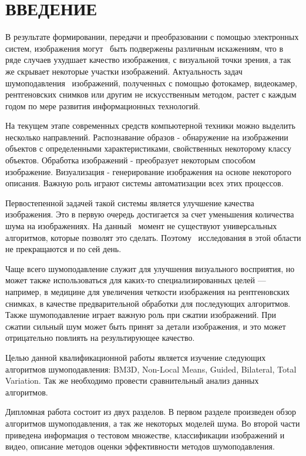 \section*{ВВЕДЕНИЕ}
В результате формировании, передачи и преобразовании с помощью электронных систем, изображения могут 
быть подвержены различным искажениям, что в ряде случаев ухудшает качество изображения, с визуальной
точки зрения, а так же скрывает некоторые участки изображений.
Актуальность задач шумоподавления  изображений, полученных с помощью фотокамер, видеокамер, рентгеновских снимков или другим не искусственным методом, растет с каждым годом по мере развития информационных технологий.

На текущем этапе современных средств компьютерной техники можно выделить несколько направлений.
Распознавание образов - обнаружение на изображении объектов с определенными характеристиками, свойственных некоторому классу объектов. Обработка изображений - преобразует некоторым способом изображение. 
Визуализация - генерирование изображения на основе некоторого описания. Важную роль играют системы 
автоматизации всех этих процессов.

Первостепенной задачей такой системы является улучшение качества изображения. Это
в первую очередь достигается за счет уменьшения количества шума на изображениях. На данный 
момент не существуют универсальных алгоритмов, которые позволят это сделать. Поэтому 
исследования в этой области не прекращаются и по сей день.

Чаще всего шумоподавление служит для улучшения визуального восприятия, но
может также использоваться для каких-то специализированных целей — например, в
медицине для увеличения четкости изображения на рентгеновских снимках, в качестве
предварительной обработки для последующих алгоритмов. Также шумоподавление играет
важную роль при сжатии изображений. При сжатии сильный шум может быть принят за
детали изображения, и это может отрицательно повлиять на результирующее качество.\cite{web:Kalinkina}

Целью данной квалификационной работы является изучение следующих алгоритмов шумоподавления: BM3D,
Non-Local Means, Guided, Bilateral, Total Variation. Так же необходимо
провести сравнительный анализ данных алгоритмов.

Дипломная работа состоит из двух разделов. В первом разделе произведен обзор алгоритмов шумоподавления, а так же некоторых моделей шума. Во второй части приведена информация о тестовом множестве, классификации изображений и видео, описание методов оценки эффективности методов шумоподавления. 
